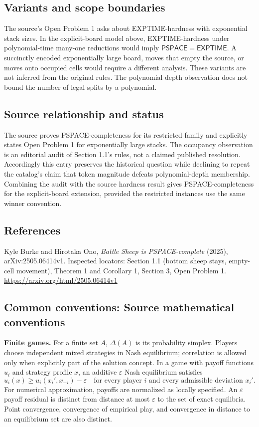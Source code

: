 \documentclass[11pt,a4paper]{article}
\begin{document}
\subsection*{Variants and scope boundaries}
The source's Open Problem 1 asks about EXPTIME-hardness with exponential stack sizes. In the explicit-board model above, EXPTIME-hardness under polynomial-time many-one reductions would imply $\mathsf{PSPACE}=\mathsf{EXPTIME}$. A succinctly encoded exponentially large board, moves that empty the source, or moves onto occupied cells would require a different analysis. These variants are not inferred from the original rules. The polynomial depth observation does not bound the number of legal splits by a polynomial.

\subsection*{Source relationship and status}
The source proves PSPACE-completeness for its restricted family and explicitly states Open Problem 1 for exponentially large stacks. The occupancy observation is an editorial audit of Section 1.1's rules, not a claimed published resolution. Accordingly this entry preserves the historical question while declining to repeat the catalog's claim that token magnitude defeats polynomial-depth membership. Combining the audit with the source hardness result gives PSPACE-completeness for the explicit-board extension, provided the restricted instances use the same winner convention.

\subsection*{References}
\begingroup\footnotesize\raggedright
\noindent [S1] Kyle Burke and Hirotaka Ono, \emph{Battle Sheep is PSPACE-complete} (2025), arXiv:2505.06414v1. Inspected locators: Section 1.1 (bottom sheep stays, empty-cell movement), Theorem 1 and Corollary 1, Section 3, Open Problem 1.
\url{https://arxiv.org/html/2505.06414v1}
\par\endgroup

\subsection*{Common conventions: Source mathematical conventions}

\textbf{Finite games.} For a finite set $A$, $\Delta(A)$ is its probability
simplex. Players choose independent mixed strategies in Nash equilibrium;
correlation is allowed only when explicitly part of the solution concept.
In a game with payoff functions $u_i$ and strategy profile $x$, an additive
$\varepsilon$ Nash equilibrium satisfies
\[
 u_i(x)\geq u_i(x_i',x_{-i})-\varepsilon
 \quad\text{for every player $i$ and every admissible deviation $x_i'$}.
\]
For numerical approximation, payoffs are normalized as locally specified.
An $\varepsilon$ payoff residual is distinct from distance at most
$\varepsilon$ to the set of exact equilibria. Point convergence, convergence
of empirical play, and convergence in distance to an equilibrium set are
also distinct.
\end{document}
